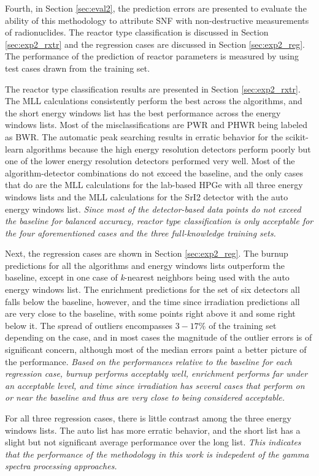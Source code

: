 Fourth, in Section \ref{sec:eval2}, the prediction errors are presented to
evaluate the ability of this methodology to attribute \gls{SNF} with
non-destructive measurements of radionuclides. The reactor type classification
is discussed in Section \ref{sec:exp2_rxtr} and the regression cases are
discussed in Section \ref{sec:exp2_reg}.  The performance of the prediction of
reactor parameters is measured by using test cases drawn from the training set.

The reactor type classification results are presented in Section
\ref{sec:exp2_rxtr}.  The \gls{MLL} calculations consistently perform the best
across the algorithms, and the short energy windows list has the best
performance across the energy windows lists.  Most of the misclassifications
are \gls{PWR} and \gls{PHWR} being labeled as \gls{BWR}.  The automatic peak
searching results in erratic behavior for the scikit-learn algorithms because
the high energy resolution detectors perform poorly but one of the lower energy
resolution detectors performed very well. Most of the algorithm-detector
combinations do not exceed the baseline, and the only cases that do are the
\gls{MLL} calculations for the lab-based \gls{HPGe} with all three energy
windows lists and the \gls{MLL} calculations for the \gls{SrI2} detector with
the auto energy windows list. \textit{Since most of the detector-based data
points do not exceed the baseline for balanced accuracy, reactor type
classification is only acceptable for the four aforementioned cases and the
three full-knowledge training sets.}

Next, the regression cases are shown in Section \ref{sec:exp2_reg}.  The burnup
predictions for all the algorithms and energy windows lists outperform the
baseline, except in one case of \textit{k}-nearest neighbors being used with
the auto energy windows list.  The enrichment predictions for the set of six
detectors all falls below the baseline, however, and the time since irradiation
predictions all are very close to the baseline, with some points right above it
and some right below it.  The spread of outliers encompasses $3-17\%$ of the
training set depending on the case, and in most cases the magnitude of the
outlier errors is of significant concern, although most of the median errors
paint a better picture of the performance.  \textit{Based on the performances
relative to the baseline for each regression case, burnup performs acceptably
well, enrichment performs far under an acceptable level, and time since
irradiation has several cases that perform on or near the baseline and thus are
very close to being considered acceptable.}

For all three regression cases, there is little contrast among the three energy
windows lists. The auto list has more erratic behavior, and the short list has
a slight but not significant average performance over the long list.
\textit{This indicates that the performance of the methodology in this work is
indepedent of the gamma spectra processing approaches.}

